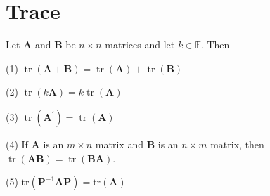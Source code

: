 \documentclass[12pt, a4paper, oneside]{book}
\begin{document}
\section{Trace}
\begin{theorem}
    Let $\mathbf{A}$ and $\mathbf{B}$ be $n \times n$ matrices and let $k\in \mathbb{F}$. Then

    (1) $\operatorname{tr}(\mathbf{A}+\mathbf{B})=\operatorname{tr}(\mathbf{A})+\operatorname{tr}(\mathbf{B})$

    (2) $\operatorname{tr}(k \mathbf{A})=k \operatorname{tr}(\mathbf{A})$

    (3) $\operatorname{tr}\left(\mathbf{A}^{\prime}\right)=\operatorname{tr}(\mathbf{A})$

    (4) If $\mathbf{A}$ is an $m\times n$ matrix and $\mathbf{B}$ is an $n\times m$ matrix, then $\operatorname{tr}({\mathbf{A} \mathbf{B}})=\operatorname{tr}(\mathbf{B} \mathbf{A})$.

    (5) $\mathrm{tr}\left(\mathbf{P}^{-1}\mathbf{A}\mathbf{P}\right) = \mathrm{tr}\left(\mathbf{A}\right)$
\end{theorem}
\end{document}
